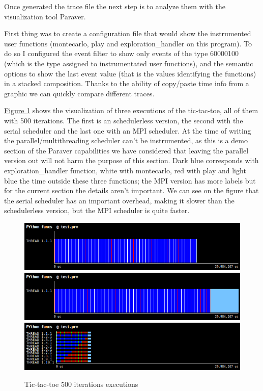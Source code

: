 Once generated the trace file the next step is to analyze them with the visualization tool Paraver.

First thing was to create a configuration file that would show the instrumented user functions (montecarlo, play and exploration\_handler on this program). To do so I configured the event filter to show only events of the type 60000100 (which is the type assigned to instrumentated user functions), and the semantic options to show the last event value (that is the values identifying the functions) in a stacked composition. Thanks to the ability of copy/paste time info from a graphic we can quickly compare different traces.

 \hyperref[fig:fig:ttt-python-funcs-seq]{Figure \ref{fig:ttt-python-funcs-seq}} shows the visualization of three executions of the tic-tac-toe, all of them with 500 iterations. The first is an schedulerless version, the second with the serial scheduler and the last one with an MPI scheduler. At the time of writing the parallel/multithreading scheduler can't be instrumented, as this is a demo section of the Paraver capabilities we have considered that leaving the parallel version out will not harm the purpose of this section. Dark blue corresponds with exploration\_handler function, white with montecarlo, red with play and light blue the time outside these three functions; the MPI version has more labels but for the current section the details aren't important. We can see on the figure that the serial scheduler has an important overhead, making it slower than the schedulerless version, but the MPI scheduler is quite faster.
 
 
\begin{figure}[h]
\includegraphics[width=\textwidth]{img/ttt_500_python_funcsG11.png}
\includegraphics[width=\textwidth]{img/ttt_500_python_funcsG12.png}
\includegraphics[width=\textwidth]{img/ttt_500_python_funcsG13.png}
\caption{Tic-tac-toe 500 iterations executions}
\label{fig:ttt-python-funcs-seq}
\end{figure}


